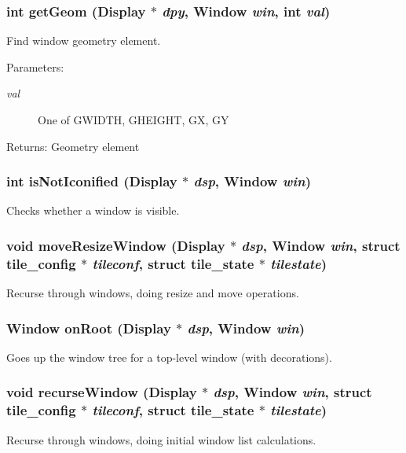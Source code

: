 \subsubsection{\setlength{\rightskip}{0pt plus 5cm}int get\-Geom (Display $\ast$ {\em dpy}, Window {\em win}, int {\em val})}\label{x11_8c_a0}


Find window geometry element. 

\begin{Desc}
\item[Parameters:]
\begin{description}
\item[{\em val}]One of GWIDTH, GHEIGHT, GX, GY \end{description}
\end{Desc}
\begin{Desc}
\item[Returns:]Geometry element \end{Desc}
\subsubsection{\setlength{\rightskip}{0pt plus 5cm}int is\-Not\-Iconified (Display $\ast$ {\em dsp}, Window {\em win})}\label{x11_8c_a4}


Checks whether a window is visible. 

\subsubsection{\setlength{\rightskip}{0pt plus 5cm}void move\-Resize\-Window (Display $\ast$ {\em dsp}, Window {\em win}, struct {\bf tile\_\-config} $\ast$ {\em tileconf}, struct {\bf tile\_\-state} $\ast$ {\em tilestate})}\label{x11_8c_a3}


Recurse through windows, doing resize and move operations. 

\subsubsection{\setlength{\rightskip}{0pt plus 5cm}Window on\-Root (Display $\ast$ {\em dsp}, Window {\em win})}\label{x11_8c_a1}


Goes up the window tree for a top-level window (with decorations). 

\subsubsection{\setlength{\rightskip}{0pt plus 5cm}void recurse\-Window (Display $\ast$ {\em dsp}, Window {\em win}, struct {\bf tile\_\-config} $\ast$ {\em tileconf}, struct {\bf tile\_\-state} $\ast$ {\em tilestate})}\label{x11_8c_a2}


Recurse through windows, doing initial window list calculations. 


